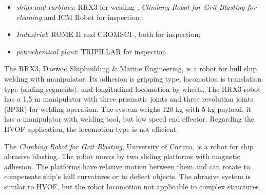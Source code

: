 \begin{itemize}
  \item \emph {ships and turbines}: RRX3 for welding
   \citep{rrx3}, \emph{Climbing Robot for Grit Blasting for cleaning}
   \citep{crgb} and ICM Robot for inspection \citep{icm};
  \item \emph{Industrial}: ROME II \citep{roma} and CROMSCI \citep{CROMSCI}, both for inspection;
  \item \emph{petrochemical plant}: TRIPILLAR \citep{tripillar} for inspection.
\end{itemize}

The RRX3, Daewoo Shipbuilding \& Marine Engineering, is a
robot for hull ship welding with manipulator. Its adhesion is gripping
type, locomotion is translation type (sliding segments), and longitudinal locomotion by wheels.
The RRX3 robot has a 1.5 m manipulator with three prismatic joints and three
revolution joints  (3P3R) for welding operation. The system weighs 120 kg with 5
kg payload, it has a manipulator with welding tool, but low speed end effector.
Regarding the HVOF application, the locomotion type is not efficient.



The \emph{Climbing Robot for Grit Blasting}, %
University of Coruna, is a robot for ship abrasive blasting. The robot moves by
two sliding platforms with magnetic adhesion. The platforms have relative motion
between them and can rotate to compensate ship's hull curvatures or to
deflect objects. The abrasive system is similar to HVOF, but the robot locomotion not applicable to complex structures.


